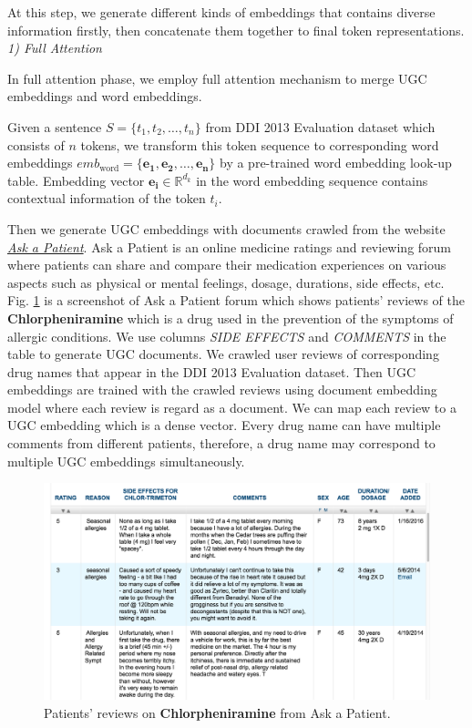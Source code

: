 \documentclass[conference]{IEEEtran}
\begin{document}
At this step, we generate different kinds of embeddings that contains diverse information firstly,
then concatenate them together to final token representations.\\

\emph{1) Full Attention}

\bigbreak

In full attention phase, we employ full attention mechanism to merge UGC embeddings and word embeddings.

Given a sentence $S = \{t_1, t_2, \dots, t_n\}$ from DDI 2013 Evaluation dataset
which consists of $n$ tokens, we transform this token sequence to corresponding word embeddings
$emb_{\text{word}} = \{ \bm{e_1}, \bm{e_2}, \dots, \bm{e_n} \}$ by a pre-trained word embedding look-up table.
Embedding vector $\bm{e_i} \in \mathbb{R}^{d_{k}}$ in the word embedding sequence contains contextual information of the token $t_i$.

Then we generate UGC embeddings with documents crawled from the website
\href{www.askapatient.com}{\emph{Ask a Patient}}.
Ask a Patient is an online medicine ratings and reviewing forum where patients can
share and compare their medication experiences on various aspects
such as physical or mental feelings, dosage, durations, side effects, etc.
Fig. \ref{fig:askapatient} is a screenshot of Ask a Patient forum which shows patients' reviews of the
\textbf{Chlorpheniramine} which is a drug used in the prevention of the symptoms of allergic conditions.
We use columns \emph{SIDE EFFECTS} and \emph{COMMENTS} in the table to generate UGC documents.
We crawled user reviews of corresponding drug names that appear in the DDI 2013 Evaluation dataset.
Then UGC embeddings are trained with the crawled reviews using document embedding model 
\cite{le_distributed_2014} where each review is regard as a document.
We can map each review to a UGC embedding which is a dense vector.
Every drug name can have multiple comments from different patients,
therefore, a drug name may correspond to multiple UGC embeddings simultaneously.

\begin{figure}[ht]
	\centering
	\includegraphics[scale=0.3]{figures/askapatient}
	\caption{Patients' reviews on \textbf{Chlorpheniramine} from Ask a Patient.}
	\label{fig:askapatient}
\end{figure}
\end{document}

